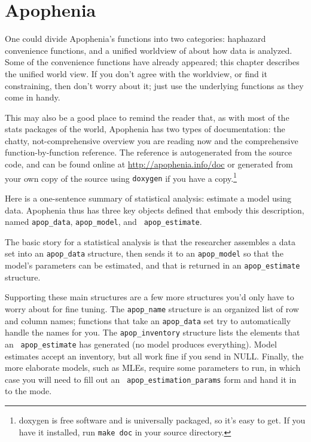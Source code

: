 \chapter{Apophenia}

One could divide Apophenia's functions into two categories: haphazard
convenience functions, and a unified worldview of about how data is
analyzed. Some of the convenience functions have already appeared; this
chapter describes the unified world view. If you don't agree with the
worldview, or find it constraining, then don't worry about it; just use
the underlying functions as they come in handy.

This may also be a good place to remind the reader that, as with most of
the stats packages of the world, Apophenia has two types of
documentation: the chatty, not-comprehensive overview you are reading now and the
comprehensive function-by-function reference. The reference is autogenerated from the
source code, and can be found online at \url{http://apophenia.info/doc}
or generated from your own copy of the source using {\tt doxygen} if you
have a copy.\footnote{doxygen is free software and is universally packaged,
so it's easy to get. If you have it installed, run {\tt make doc} in
your source directory.}

Here is a one-sentence summary of statistical analysis: estimate a model
using data. Apophenia thus has three key objects defined that embody
this description, named {\tt apop\_data}, {\tt apop\_model}, and {\tt
apop\_estimate}.

The basic story for a statistical analysis is that the researcher
assembles a data set into an {\tt apop\_data} structure, then sends it to
an {\tt apop\_model} so that the model's parameters can be estimated,
and that is returned in an {\tt apop\_estimate} structure.

Supporting these main structures are a few more structures you'd only have to worry about 
for fine tuning.
The {\tt apop\_name}
structure is an organized list of row and column names; functions that
take an {\tt apop\_data} set try to automatically handle the names for you.
The {\tt apop\_inventory} structure lists the elements that an {\tt
apop\_estimate} has generated (no model produces everything). Model
estimates accept an inventory, but all work fine if you send in
NULL. Finally, the more elaborate models, such as MLEs, require some parameters to run,
in which case you will need to fill out an {\tt
apop\_estimation\_params}
form and hand it in to the mode.



